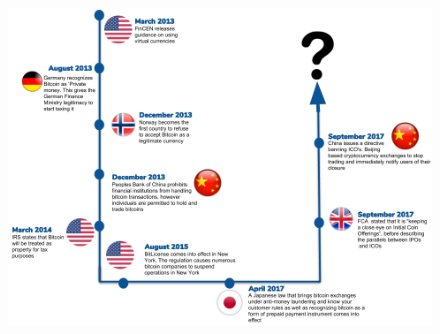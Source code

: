 \documentclass[11pt]{beamer}
\begin{document}
\begin{frame}{}
	\begin{figure}[]
		\centering
		\includegraphics  [scale=0.3]{Images/reg-timeline}
	\end{figure}
\end{frame}

\end{document}
